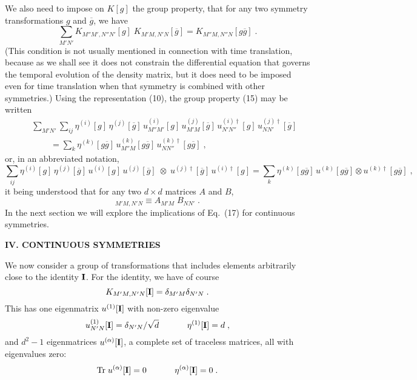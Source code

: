 We also need to impose on $K[g]$ the group property, that for any two symmetry transformations $g$ and $\overline{g}$, we have
\begin{equation}
\sum_{M'N'}K_{M''M',N''N'}[g]\;K_{M'M,N'N}[\overline{g}]=K_{M''M,N''N}[g\overline{g}]\;.
\end{equation}
(This condition is not usually mentioned in connection with time translation, because as we shall see it does not constrain the differential equation that governs the temporal evolution of the density matrix, but it does need to be imposed even for time translation when that symmetry is combined with other symmetries.)
Using the representation (10), the group property (15) may be written
\begin{eqnarray}
&&\sum_{M'N'}\sum_{ij}\eta^{(i)}[g]\,\eta^{(j)}[\overline{g}]\,u^{(i)}_{M''M'}[g]\,u^{(j)}_{M'M}[\overline{g}]\,u^{(i)\dagger}_{N'N''}[g]\,u^{(j)\dagger}_{NN'}[\overline{g}]\nonumber\\&&
~~~~~~~~~~=\sum_k \eta^{(k)}[g\overline{g}]\,u^{(k)}_{M''M}[g\overline{g}]\,u^{(k)\dagger}_{NN''}[g\overline{g}]\;,
\end{eqnarray}
or, in an abbreviated notation,
\begin{equation}
\sum_{ij}\eta^{(i)}[g]\,\eta^{(j)}[\overline{g}]\,u^{(i)}[g]\,u^{(j)}[\overline{g}]\;\otimes\; u^{(j)\dagger}[\overline{g}]\,u^{(i)\dagger}[g]
=\sum_k \eta^{(k)}[g\overline{g}]\,u^{(k)}[g\overline{g}]\otimes u^{(k)\dagger}[g\overline{g}]\;,
\end{equation}
it being understood that for any two $d\times d$ matrices $A$ and $B$, 
\begin{equation}
[A\otimes B]_{M'M,N'N}\equiv A_{M'M}\;B_{NN'}\;.
\end{equation}
In the next section we will explore the implications of Eq.~(17) for continuous symmetries.

\vspace{20pt}

\begin{center}
{\bf IV. CONTINUOUS SYMMETRIES}
\end{center}

We now consider a group of transformations that includes elements arbitrarily close to the identity ${\bf I}$.    For the identity, we have of course
\begin{equation}
K_{M'M,N'N}[{\bf I}]=\delta_{M'M}\delta_{N'N}\;.
\end{equation}
This has one eigenmatrix $u^{(1)}[{\bf I}]$ with non-zero eigenvalue
\begin{equation}
u^{(1)}_{N'N}[{\bf I}]=\delta_{N'N}/\sqrt{d}~~~~~~~~~~\eta^{(1)}[{\bf I}]=d\;,
\end{equation}
and $ d^2-1$ eigenmatrices $u^{(\alpha)}[{\bf I}]$, a complete set of traceless matrices, all  with  eigenvalues zero:
\begin{equation}
{\rm Tr}\; u^{(\alpha)}[{\bf I}]=0~~~~~~~~~~\eta^{(\alpha)}[{\bf I}]=0\;.
\end{equation}

